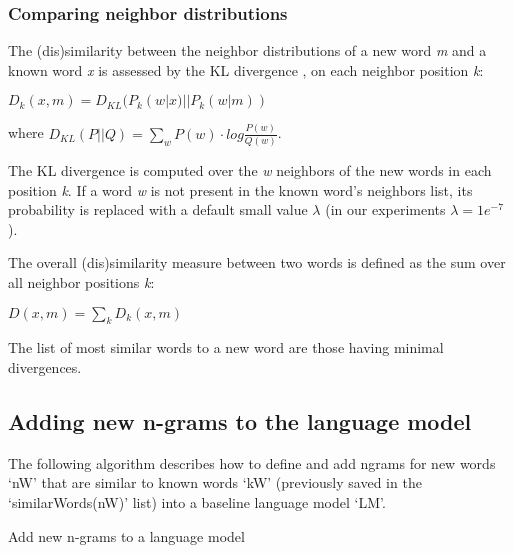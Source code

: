 \documentclass[conference]{IEEEtran}
\makeatletter
\def\BState{\State\hskip-\ALG@thistlm}
\makeatother
\begin{document}
\subsubsection{Comparing neighbor distributions}

The (dis)similarity between the neighbor distributions of a new word \textit{m} and a known word \textit{x} is assessed by the KL divergence  \cite{Kullback:1951}, on each neighbor position \textit{k}:

\begin{center}$D_{k}(x,m)=D_{KL}(P_{k}(w|x) || P_{k}(w|m))$\end{center}

where 
$D_{KL}(P||Q)=\sum_{w}^{ }  P(w) \cdot log\frac{P(w)}{Q(w)}$.

The KL divergence is computed over the \textit{w} neighbors of the new words in each position \textit{k}. If a word \textit{w} is not present in the known word's neighbors list, its probability is replaced with a default small value $\lambda$ (in our experiments $\lambda=1e^{-7}$).

The overall (dis)similarity measure between two words is defined as the sum over all neighbor positions \textit{k}: 

\begin{center}$D(x,m)=\sum_{k}^{ }  D_{k}(x,m)$\end{center}

The list of most similar words to a new word are those having minimal divergences. 


\subsection{Adding new n-grams to the language model}

The following algorithm describes how to define and add ngrams for new words `nW' that are similar to known words `kW' (previously saved in the `similarWords(nW)' list) into a baseline language model `LM'.

\begin{algorithm}
\caption{Add new n-grams to a language model}\label{addNewNgrams}
\end{algorithm}
\end{document}
